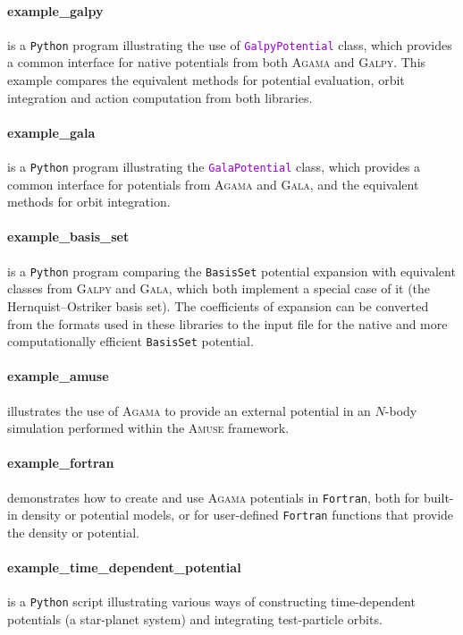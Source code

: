 \documentclass[12pt]{article}
\newcommand{\Agama}{\textsc{Agama}\xspace}
\newcommand{\Amuse}{\textsc{Amuse}\xspace}
\newcommand{\Galpy}{\textsc{Galpy}\xspace}
\newcommand{\Gala} {\textsc{Gala}\xspace}
\newcommand{\Python}{\texttt{Python}\xspace}
\newcommand{\Fortran}{\texttt{Fortran}\xspace}
\newcommand{\ttt}[1]{\textcolor{darkviolet}{\texttt{#1}}}
\newcommand{\ppp}[1]{\textcolor{darkolive} {\texttt{#1}}}
\begin{document}
\paragraph{example_galpy} is a \Python program illustrating the use of \ttt{GalpyPotential} class, which provides a common interface for native potentials from both \Agama and \Galpy. This example compares the equivalent methods for potential evaluation, orbit integration and action computation from both libraries.

\paragraph{example_gala} is a \Python program illustrating the \ttt{GalaPotential} class, which provides a common interface for potentials from \Agama and \Gala, and the equivalent methods for orbit integration.

\paragraph{example_basis_set} is a \Python program comparing the \ppp{BasisSet} potential expansion with equivalent classes from \Galpy and \Gala, which both implement a special case of it (the Hernquist--Ostriker basis set). The coefficients of expansion can be converted from the formats used in these libraries to the input file for the native and more computationally efficient \ppp{BasisSet} potential.

\paragraph{example_amuse} illustrates the use of \Agama to provide an external potential in an $N$-body simulation performed within the \Amuse framework.

\paragraph{example_fortran} demonstrates how to create and use \Agama potentials in \Fortran, both for built-in density or potential models, or for user-defined \Fortran functions that provide the density or potential.

\paragraph{example_time_dependent_potential} is a \Python script illustrating various ways of constructing time-dependent potentials (a star-planet system) and integrating test-particle orbits.
\end{document}
